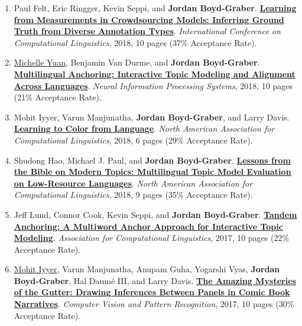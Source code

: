 {\begin{enumerate}
	 \item Paul Felt, Eric Ringger, Kevin Seppi, and {\bf Jordan Boyd-Graber}.  {\bf \href{http://cs.umd.edu/~jbg//docs/2018_coling_measurements.pdf}{Learning from Measurements in Crowdsourcing Models: Inferring Ground Truth from Diverse Annotation Types}}.  \emph{International Conference on Computational Linguistics}, 2018, 10 pages (37\% Acceptance Rate).

	 \item \underline{\href{https://forest-snow.github.io/}{Michelle Yuan}}, Benjamin {Van Durme}, and {\bf Jordan Boyd-Graber}.  {\bf \href{http://cs.umd.edu/~jbg//docs/2018_neurips_mtanchor.pdf}{Multilingual Anchoring: Interactive Topic Modeling and Alignment  Across Languages}}.  \emph{Neural Information Processing Systems}, 2018, 10 pages (21\% Acceptance Rate).

	 \item Mohit Iyyer, Varun Manjunatha, {\bf Jordan Boyd-Graber}, and Larry Davis.  {\bf \href{http://cs.umd.edu/~jbg//docs/2018_naacl_colorization.pdf}{Learning to Color from Language}}.  \emph{North American Association for Computational Linguistics}, 2018, 6 pages (29\% Acceptance Rate).

	 \item Shudong Hao, Michael J. Paul, and {\bf Jordan Boyd-Graber}.  {\bf \href{http://cs.umd.edu/~jbg//docs/2018_naacl_mltm_eval.pdf}{Lessons from the Bible on Modern Topics: Multilingual Topic Model Evaluation on Low-Resource Languages}}.  \emph{North American Association for Computational Linguistics}, 2018, 9 pages (35\% Acceptance Rate).

	 \item Jeff Lund, Connor Cook, Kevin Seppi, and {\bf Jordan Boyd-Graber}.  {\bf \href{http://cs.umd.edu/~jbg//docs/2017_acl_multiword_anchors.pdf}{Tandem Anchoring: A Multiword Anchor Approach for Interactive Topic Modeling}}.  \emph{Association for Computational Linguistics}, 2017, 10 pages (22\% Acceptance Rate).

	 \item \underline{\href{https://people.cs.umass.edu/~miyyer/}{Mohit Iyyer}}, Varun Manjunatha, Anupam Guha, Yogarshi Vyas, {\bf Jordan Boyd-Graber}, Hal {Daum\'{e} III}, and Larry Davis.  {\bf \href{http://cs.umd.edu/~jbg//docs/2017_cvpr_comics.pdf}{The Amazing Mysteries of the Gutter: Drawing Inferences Between Panels in Comic Book Narratives}}.  \emph{Computer Vision and Pattern Recognition}, 2017, 10 pages (30\% Acceptance Rate).


\end{enumerate}}
